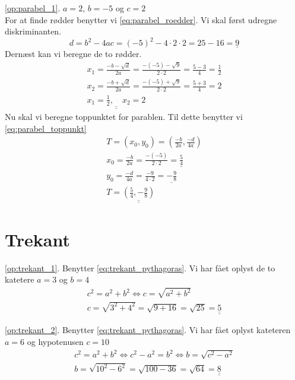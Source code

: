 \documentclass[11pt,a5paper,fleqn,leqno]{book}
\begin{document}
\ref{op:parabel_1}. $a = 2$, $b = -5$ og $c = 2$ \\
For at finde rødder benytter vi \eqref{eq:parabel_roedder}. Vi skal først udregne diskriminanten.
\[d = b^2 - 4ac = (-5)^2 - 4 \cdot 2 \cdot 2 = 25 - 16 = \underline{9}\]
Dernæst kan vi beregne de to rødder.
\begin{displaymath}\begin{array}{l}
x_1 = \frac{-b-\sqrt{d}}{2a} = \frac{-(-5) - \sqrt{9}}{2 \cdot 2} = \frac{5 - 3}{4} = \frac{1}{2} \\
x_2 = \frac{-b+\sqrt{d}}{2a} = \frac{-(-5) + \sqrt{9}}{2 \cdot 2} = \frac{5 + 3}{4} = 2 \\
\underline{\underline{x_1 = \frac{1}{2}, \quad x_2 = 2}}
\end{array}\end{displaymath}
Nu skal vi beregne toppunktet for parablen. Til dette benytter vi \eqref{eq:parabel_toppunkt}
\begin{displaymath}\begin{array}{l}
T = \left(x_0,y_0\right) = \left(\frac{-b}{2a},\frac{-d}{4a}\right) \\
x_0 = \frac{-b}{2a} = \frac{-(-5)}{2 \cdot 2} = \underline{\frac{5}{4}} \\
y_0 = \frac{-d}{4a} = \frac{-9}{4 \cdot 2} = \underline{-\frac{9}{8}} \\
T = \underline{\underline{\left(\frac{5}{4}, -\frac{9}{8}\right)}}
\end{array}\end{displaymath}

\section{Trekant}

\ref{op:trekant_1}. Benytter \eqref{eq:trekant_pythagoras}. Vi har fået oplyst de to katetere $a = 3$ og $b = 4$
\begin{displaymath}\begin{array}{l}
c^2 = a^2 + b^2 \Leftrightarrow c = \sqrt{a^2 + b^2} \\
c = \sqrt{3^2 + 4^2} = \sqrt{9 + 16} = \sqrt{25} = \underline{\underline{5}}
\end{array}\end{displaymath}

\ref{op:trekant_2}. Benytter \eqref{eq:trekant_pythagoras}. Vi har fået oplyst kateteren $a = 6$ og hypotenusen $c = 10$
\begin{displaymath}\begin{array}{l}
c^2 = a^2 + b^2 \Leftrightarrow c^2 - a^2 = b^2 \Leftrightarrow b = \sqrt{c^2 - a^2} \\
b = \sqrt{10^2 - 6^2} = \sqrt{100 - 36} = \sqrt{64} = \underline{\underline{8}}
\end{array}\end{displaymath}
\end{document}

